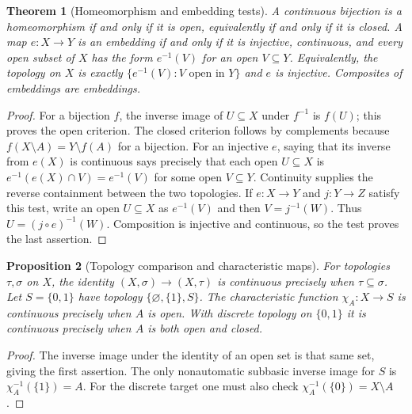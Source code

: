 \documentclass[11pt,oneside,openany]{book}
\newtheorem{theorem}{Theorem}[chapter]
\newtheorem{proposition}[theorem]{Proposition}
\theoremstyle{definition}
\theoremstyle{remark}
\begin{document}
\begin{theorem}[Homeomorphism and embedding tests]\label{d10:02:embedding}
A continuous bijection is a homeomorphism if and only if it is open, equivalently if and only if it is closed. A map $e:X\to Y$ is an embedding if and only if it is injective, continuous, and every open subset of $X$ has the form $e^{-1}(V)$ for an open $V\subseteq Y$. Equivalently, the topology on $X$ is exactly $\{e^{-1}(V):V\text{ open in }Y\}$ and $e$ is injective. Composites of embeddings are embeddings.
\end{theorem}
\begin{proof}
For a bijection $f$, the inverse image of $U\subseteq X$ under $f^{-1}$ is $f(U)$; this proves the open criterion. The closed criterion follows by complements because $f(X\setminus A)=Y\setminus f(A)$ for a bijection. For an injective $e$, saying that its inverse from $e(X)$ is continuous says precisely that each open $U\subseteq X$ is $e^{-1}(e(X)\cap V)=e^{-1}(V)$ for some open $V\subseteq Y$. Continuity supplies the reverse containment between the two topologies. If $e:X\to Y$ and $j:Y\to Z$ satisfy this test, write an open $U\subseteq X$ as $e^{-1}(V)$ and then $V=j^{-1}(W)$. Thus $U=(j\circ e)^{-1}(W)$. Composition is injective and continuous, so the test proves the last assertion.
\end{proof}

\begin{proposition}[Topology comparison and characteristic maps]\label{d10:02:characteristic}
For topologies $\tau,\sigma$ on $X$, the identity $(X,\sigma)\to(X,\tau)$ is continuous precisely when $\tau\subseteq\sigma$. Let $S=\{0,1\}$ have topology $\{\varnothing,\{1\},S\}$. The characteristic function $\chi_A:X\to S$ is continuous precisely when $A$ is open. With discrete topology on $\{0,1\}$ it is continuous precisely when $A$ is both open and closed.
\end{proposition}
\begin{proof}
The inverse image under the identity of an open set is that same set, giving the first assertion. The only nonautomatic subbasic inverse image for $S$ is $\chi_A^{-1}(\{1\})=A$. For the discrete target one must also check $\chi_A^{-1}(\{0\})=X\setminus A$.
\end{proof}
\end{document}
